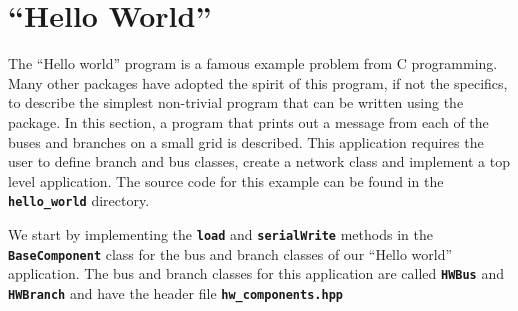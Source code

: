 \section{``Hello World''}\label{hello_world}

The ``Hello world'' program is a famous example problem from C programming. Many other packages have adopted the spirit of this program, if not the specifics, to describe the simplest non-trivial program that can be written using the package. In this section, a program that prints out a message from each of the buses and branches on a small grid is described. This application requires the user to define branch and bus classes, create a network class and implement a top level application. The source code for this example can be found in the \texttt{\textbf{hello\_world}} directory.

We start by implementing the \texttt{\textbf{load}} and
\texttt{\textbf{serialWrite}} methods in the \texttt{\textbf{BaseComponent}}
class for the bus and branch classes of our ``Hello world'' application. The bus
and branch classes for this application are called \texttt{\textbf{HWBus}} and
\texttt{\textbf{HWBranch}} and have the header file
\texttt{\textbf{hw\_components.hpp}}

